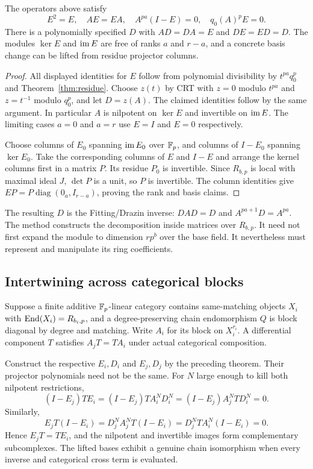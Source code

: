 \begin{theorem}\label{thm:fitting}
The operators above satisfy
\[
 E^2=E,\quad AE=EA,\quad A^{pa}(I-E)=0,\quad q_0(A)^pE=0.
\]
There is a polynomially specified $D$ with
$AD=DA=E$ and $DE=ED=D$.
The modules $\ker E$ and $\operatorname{im} E$ are free of ranks $a$ and $r-a$,
and a concrete basis change can be lifted from residue projector columns.
\end{theorem}
\begin{proof}
All displayed identities for $E$ follow from polynomial divisibility by
$t^{pa}q_0^p$ and Theorem~\ref{thm:residue}.
Choose $z(t)$ by CRT with $z=0$ modulo $t^{pa}$ and
$z=t^{-1}$ modulo $q_0^p$, and let $D=z(A)$.
The claimed identities follow by the same argument.
In particular $A$ is nilpotent on $\ker E$ and invertible on $\operatorname{im} E$.
The limiting cases $a=0$ and $a=r$ use $E=I$ and $E=0$ respectively.

Choose columns of $E_0$ spanning $\operatorname{im} E_0$ over $\mathbb F_p$, and columns of
$I-E_0$ spanning $\ker E_0$. Take the corresponding columns of $E$ and
$I-E$ and arrange the kernel columns first in a matrix $P$.
Its residue $P_0$ is invertible. Since $R_{b,p}$ is local with maximal
ideal $J$, $\det P$ is a unit, so $P$ is invertible.
The column identities give
$EP=P\operatorname{diag}(0_a,I_{r-a})$, proving the rank and basis claims.
\end{proof}

The resulting $D$ is the Fitting/Drazin inverse:
$DAD=D$ and $A^{pa+1}D=A^{pa}$.
The method constructs the decomposition inside matrices over $R_{b,p}$.
It need not first expand the module to dimension $rp^b$ over the base field.
It nevertheless must represent and manipulate its ring coefficients.

\subsection{Intertwining across categorical blocks}

Suppose a finite additive $\mathbb F_p$-linear category contains same-matching
objects $X_i$ with $\operatorname{End}(X_i)=R_{b_i,p}$, and a degree-preserving chain
endomorphism $Q$ is block diagonal by degree and matching.
Write $A_i$ for its block on $X_i^{r_i}$. A differential component $T$
satisfies $A_jT=TA_i$ under actual categorical composition.

Construct the respective $E_i,D_i$ and $E_j,D_j$ by the preceding theorem.
Their projector polynomials need not be the same.
For $N$ large enough to kill both nilpotent restrictions,
\[
 (I-E_j)TE_i
  =(I-E_j)TA_i^ND_i^N
  =(I-E_j)A_j^NTD_i^N=0.
\]
Similarly,
\[
 E_jT(I-E_i)
  =D_j^NA_j^NT(I-E_i)
  =D_j^NTA_i^N(I-E_i)=0.
\]
Hence $E_jT=TE_i$, and the nilpotent and invertible images form
complementary subcomplexes. The lifted bases exhibit a genuine chain
isomorphism when every inverse and categorical cross term is evaluated.

